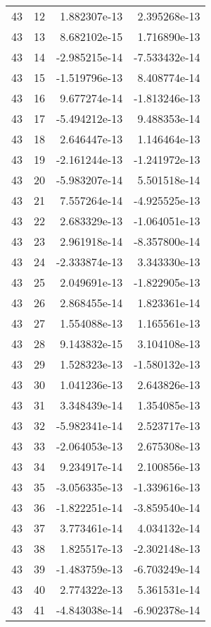 \begin{tabular}{rrrr}
  43 &   12 &  1.882307e-13 &  2.395268e-13 \\
  43 &   13 &  8.682102e-15 &  1.716890e-13 \\
  43 &   14 & -2.985215e-14 & -7.533432e-14 \\
  43 &   15 & -1.519796e-13 &  8.408774e-14 \\
  43 &   16 &  9.677274e-14 & -1.813246e-13 \\
  43 &   17 & -5.494212e-13 &  9.488353e-14 \\
  43 &   18 &  2.646447e-13 &  1.146464e-13 \\
  43 &   19 & -2.161244e-13 & -1.241972e-13 \\
  43 &   20 & -5.983207e-14 &  5.501518e-14 \\
  43 &   21 &  7.557264e-14 & -4.925525e-13 \\
  43 &   22 &  2.683329e-13 & -1.064051e-13 \\
  43 &   23 &  2.961918e-14 & -8.357800e-14 \\
  43 &   24 & -2.333874e-13 &  3.343330e-13 \\
  43 &   25 &  2.049691e-13 & -1.822905e-13 \\
  43 &   26 &  2.868455e-14 &  1.823361e-14 \\
  43 &   27 &  1.554088e-13 &  1.165561e-13 \\
  43 &   28 &  9.143832e-15 &  3.104108e-13 \\
  43 &   29 &  1.528323e-13 & -1.580132e-13 \\
  43 &   30 &  1.041236e-13 &  2.643826e-13 \\
  43 &   31 &  3.348439e-14 &  1.354085e-13 \\
  43 &   32 & -5.982341e-14 &  2.523717e-13 \\
  43 &   33 & -2.064053e-13 &  2.675308e-13 \\
  43 &   34 &  9.234917e-14 &  2.100856e-13 \\
  43 &   35 & -3.056335e-13 & -1.339616e-13 \\
  43 &   36 & -1.822251e-14 & -3.859540e-14 \\
  43 &   37 &  3.773461e-14 &  4.034132e-14 \\
  43 &   38 &  1.825517e-13 & -2.302148e-13 \\
  43 &   39 & -1.483759e-13 & -6.703249e-14 \\
  43 &   40 &  2.774322e-13 &  5.361531e-14 \\
  43 &   41 & -4.843038e-14 & -6.902378e-14 \\

\end{tabular}
